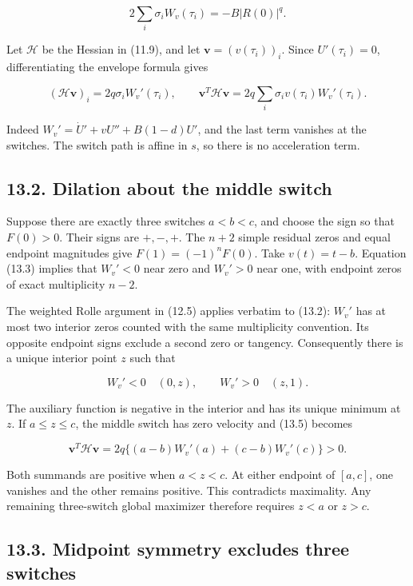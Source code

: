 \documentclass[11pt]{article}
\begin{document}
\[
2\sum_i\sigma_i W_v(\tau_i)=-B|R(0)|^q.
\tag{13.4}
\]

Let \(\mathcal H\) be the Hessian in (11.9), and let
\(\mathbf v=(v(\tau_i))_i\). Since \(U'(\tau_i)=0\), differentiating the
envelope formula gives

\[
(\mathcal H\mathbf v)_i=2q\sigma_iW_v'(\tau_i),\qquad
\mathbf v^T\mathcal H\mathbf v
=2q\sum_i\sigma_i v(\tau_i)W_v'(\tau_i).
\tag{13.5}
\]

Indeed \(W_v'=\dot U'+vU''+B(1-d)U'\), and the last term vanishes at the
switches. The switch path is affine in \(s\), so there is no
acceleration term.

\subsection{13.2. Dilation about the middle
switch}\label{dilation-about-the-middle-switch}

Suppose there are exactly three switches \(a<b<c\), and choose the sign
so that \(F(0)>0\). Their signs are \(+,-,+\). The \(n+2\) simple
residual zeros and equal endpoint magnitudes give \(F(1)=(-1)^nF(0)\).
Take \(v(t)=t-b\). Equation (13.3) implies that \(W_v'<0\) near zero and
\(W_v'>0\) near one, with endpoint zeros of exact multiplicity \(n-2\).

The weighted Rolle argument in (12.5) applies verbatim to (13.2):
\(W_v'\) has at most two interior zeros counted with the same
multiplicity convention. Its opposite endpoint signs exclude a second
zero or tangency. Consequently there is a unique interior point \(z\)
such that

\[
W_v'<0\quad(0,z),\qquad W_v'>0\quad(z,1).
\tag{13.6}
\]

The auxiliary function is negative in the interior and has its unique
minimum at \(z\). If \(a\le z\le c\), the middle switch has zero
velocity and (13.5) becomes

\[
\mathbf v^T\mathcal H\mathbf v
=2q\{(a-b)W_v'(a)+(c-b)W_v'(c)\}>0.
\tag{13.7}
\]

Both summands are positive when \(a<z<c\). At either endpoint of
\([a,c]\), one vanishes and the other remains positive. This contradicts
maximality. Any remaining three-switch global maximizer therefore
requires \(z<a\) or \(z>c\).

\subsection{13.3. Midpoint symmetry excludes three
switches}\label{midpoint-symmetry-excludes-three-switches}
\end{document}
